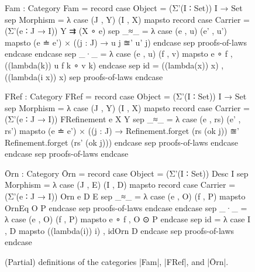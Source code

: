 \begin{figure}
\codefigure\small{}\baselineskip
\begin{code}
Fam : Category
Fam = record
  case  Object    =  (Σ'(I ∶ Set)) I → Set
  sep   Morphism  =  λ case  (J , Y) (I , X) mapsto record
                               case  Carrier  = (Σ'(e ∶ J → I)) Y ⇉ (X ∘ e)
                               sep   _≈_      = λ case  (e , u) (e' , u') mapsto
                                                          (e ≐ e') × ((j : J) → u {j} ≊' u' {j}) endcase
                               sep  proofs-of-laws endcase endcase
  sep   _·_  = λ case (e , u) (f , v) mapsto e ∘ f , ((lambda({k})) u {f k} ∘ v {k}) endcase
  sep   id   =  ((lambda(x)) x) , ((lambda({i} x)) x)
  sep   proofs-of-laws endcase

FRef : Category
FRef = record
  case  Object    =  (Σ'(I ∶ Set)) I → Set
  sep   Morphism  =  λ case  (J , Y) (I , X) mapsto record
                               case  Carrier  = (Σ'(e ∶ J → I)) FRefinement e X Y
                               sep   _≈_      = λ case  (e , rs) (e' , rs') mapsto
                                                          (e ≐ e') ×
                                                          ((j : J) →  Refinement.forget (rs   (ok j)) ≊'
                                                                      Refinement.forget (rs'  (ok j))) endcase
                               sep  proofs-of-laws endcase endcase
  sep   proofs-of-laws endcase

Ōrn : Category
Ōrn = record
  case  Object    =  (Σ'(I ∶ Set)) Desc I
  sep   Morphism  =  λ case  (J , E) (I , D) mapsto record
                               case  Carrier  = (Σ'(e ∶ J → I)) Orn e D E
                               sep   _≈_      = λ case (e , O) (f , P) mapsto OrnEq O P endcase
                               sep  proofs-of-laws endcase endcase
  sep   _·_  =  λ case (e , O) (f , P) mapsto e ∘ f , O ⊙ P endcase
  sep   id   =  λ case {I , D} mapsto ((lambda(i)) i) , idOrn D endcase
  sep   proofs-of-laws endcase
\end{code}
\caption{(Partial) definitions of the categories |Fam|, |FRef|, and |Ōrn|.}
\label{fig:concrete-categories}
\end{figure}


